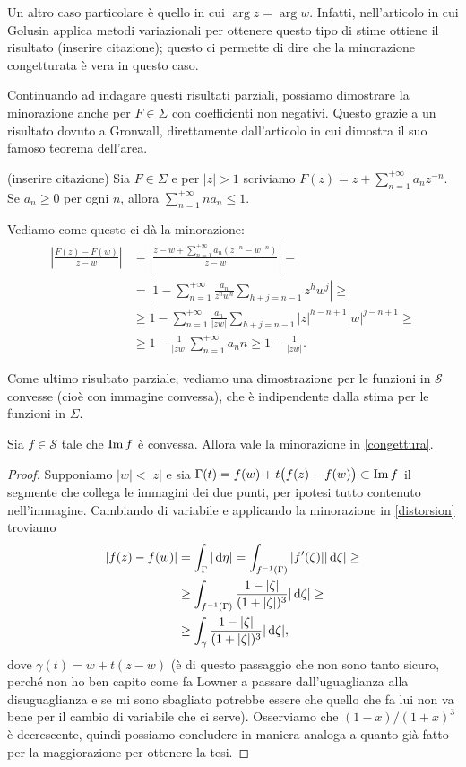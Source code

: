 Un altro caso particolare è quello in cui $\arg{z}=\arg{w}$. Infatti, nell'articolo in cui Golusin applica metodi variazionali per ottenere questo tipo di stime ottiene il risultato (inserire citazione); questo ci permette di dire che la minorazione congetturata è vera in questo caso.

Continuando ad indagare questi risultati parziali, possiamo dimostrare la minorazione anche per $F \in \Sigma$ con coefficienti non negativi. Questo grazie a un risultato dovuto a Gronwall, direttamente dall'articolo in cui dimostra il suo famoso teorema dell'area.
\begin{prop}
  (inserire citazione) Sia $F \in \Sigma$ e per $|z|>1$ scriviamo $F(z)=z+\displaystyle \sum_{n=1}^{+\infty} a_nz^{-n}$. Se $a_n \ge 0$ per ogni $n$, allora $\displaystyle \sum_{n=1}^{+\infty} na_n \le 1$.
\end{prop}
Vediamo come questo ci dà la minorazione:
\begin{align*}
  \left|\frac{F(z)-F(w)}{z-w}\right|&=\left|\frac{z-w+\sum_{n=1}^{+\infty}a_n(z^{-n}-w^{-n})}{z-w}\right|=\\
  &=\left|1-\sum_{n=1}^{+\infty} \frac{a_n}{z^nw^n}\sum_{h+j=n-1}z^hw^j\right| \ge \\
  &\ge 1-\sum_{n=1}^{+\infty} \frac{a_n}{|zw|}\sum_{h+j=n-1}|z|^{h-n+1}|w|^{j-n+1} \ge \\
  & \ge 1-\frac{1}{|zw|}\sum_{n=1}^{+\infty} a_nn \ge 1-\frac{1}{|zw|}.
\end{align*}

Come ultimo risultato parziale, vediamo una dimostrazione per le funzioni in $\mathcal{S}$ convesse (cioè con immagine convessa), che è indipendente dalla stima per le funzioni in $\Sigma$.
\begin{prop}
  Sia $f \in \mathcal{S}$ tale che $\operatorname{Im}{f}$ è convessa. Allora vale la minorazione in \eqref{congettura}.
\end{prop}
\begin{proof}
  Supponiamo $|w|<|z|$ e sia $\Gamma(t)=f(w)+t\big(f(z)-f(w)\big) \subset \operatorname{Im}{f}$ il segmente che collega le immagini dei due punti, per ipotesi tutto contenuto nell'immagine. Cambiando di variabile e applicando la minorazione in \eqref{distorsion} troviamo
  \begin{align*}
    |f(z)-f(w)|&=\int_{\Gamma} |\mathop{}\!\mathrm{d}\eta|=\int_{f^{-1}(\Gamma)} |f'(\zeta)||\mathop{}\!\mathrm{d}\zeta| \ge \\
    &\ge \int_{f^{-1}(\Gamma)} \frac{1-|\zeta|}{(1+|\zeta|)^3}|\mathop{}\!\mathrm{d}\zeta| \ge \\
    &\ge \int_\gamma \frac{1-|\zeta|}{(1+|\zeta|)^3}|\mathop{}\!\mathrm{d}\zeta|,
  \end{align*}
  dove $\gamma(t)=w+t(z-w)$ (è di questo passaggio che non sono tanto sicuro, perché non ho ben capito come fa Lowner a passare dall'uguaglianza alla disuguaglianza e se mi sono sbagliato potrebbe essere che quello che fa lui non va bene per il cambio di variabile che ci serve). Osserviamo che $(1-x)/(1+x)^3$ è decrescente, quindi possiamo concludere in maniera analoga a quanto già fatto per la maggiorazione per ottenere la tesi.
\end{proof}
